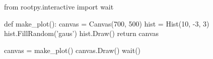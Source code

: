 \begin{footnotesize}
\begin{pyglist}[language=python,texcl=true,abovecaptionskip=0,style=vs,bgcolor=Moccasin]
from rootpy.interactive import wait

def make_plot():
    canvas = Canvas(700, 500)
    hist = Hist(10, -3, 3)
    hist.FillRandom('gaus')
    hist.Draw()
    return canvas

canvas = make_plot()
canvas.Draw()
wait()
\end{pyglist}
\end{footnotesize}
